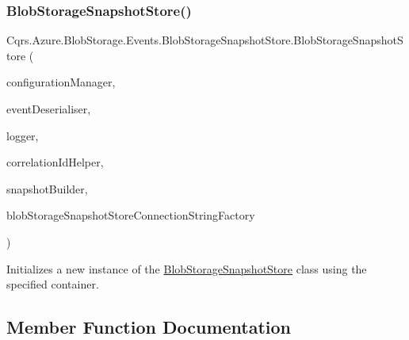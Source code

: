 \subsubsection{\texorpdfstring{Blob\+Storage\+Snapshot\+Store()}{BlobStorageSnapshotStore()}}
{\footnotesize\ttfamily Cqrs.\+Azure.\+Blob\+Storage.\+Events.\+Blob\+Storage\+Snapshot\+Store.\+Blob\+Storage\+Snapshot\+Store (\begin{DoxyParamCaption}\item[{\hyperlink{interfaceCqrs_1_1Configuration_1_1IConfigurationManager}{I\+Configuration\+Manager}}]{configuration\+Manager,  }\item[{\hyperlink{interfaceCqrs_1_1Events_1_1ISnapshotDeserialiser}{I\+Snapshot\+Deserialiser}}]{event\+Deserialiser,  }\item[{I\+Logger}]{logger,  }\item[{I\+Correlation\+Id\+Helper}]{correlation\+Id\+Helper,  }\item[{\hyperlink{interfaceCqrs_1_1Events_1_1ISnapshotBuilder}{I\+Snapshot\+Builder}}]{snapshot\+Builder,  }\item[{\hyperlink{interfaceCqrs_1_1Azure_1_1BlobStorage_1_1IBlobStorageSnapshotStoreConnectionStringFactory}{I\+Blob\+Storage\+Snapshot\+Store\+Connection\+String\+Factory}}]{blob\+Storage\+Snapshot\+Store\+Connection\+String\+Factory }\end{DoxyParamCaption})}



Initializes a new instance of the \hyperlink{classCqrs_1_1Azure_1_1BlobStorage_1_1Events_1_1BlobStorageSnapshotStore}{Blob\+Storage\+Snapshot\+Store} class using the specified container. 



\subsection{Member Function Documentation}
\mbox{\label{classCqrs_1_1Azure_1_1BlobStorage_1_1Events_1_1BlobStorageSnapshotStore_a0d5d8af1e7e243d05ccc064b532bee2b_a0d5d8af1e7e243d05ccc064b532bee2b}} 
